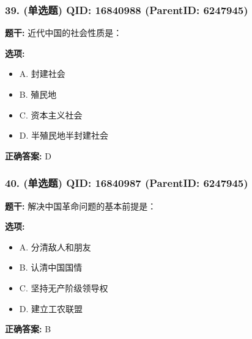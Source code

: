 \documentclass[12pt,UTF8]{ctexart}
\begin{document}
\vspace{0.3em}\hrulefill\vspace{0.7em}

\subsubsection*{39. (单选题) \small QID: 16840988 (ParentID: 6247945)}

\textbf{题干:}
近代中国的社会性质是：



\textbf{选项:}
\begin{itemize}[leftmargin=*]

  \item A. 封建社会

  \item B. 殖民地

  \item C. 资本主义社会

  \item D. 半殖民地半封建社会

\end{itemize}

\textbf{正确答案:}
D

\vspace{0.3em}\hrulefill\vspace{0.7em}

\subsubsection*{40. (单选题) \small QID: 16840987 (ParentID: 6247945)}

\textbf{题干:}
解决中国革命问题的基本前提是：



\textbf{选项:}
\begin{itemize}[leftmargin=*]

  \item A. 分清敌人和朋友

  \item B. 认清中国国情

  \item C. 坚持无产阶级领导权

  \item D. 建立工农联盟

\end{itemize}

\textbf{正确答案:}
B

\vspace{0.3em}\hrulefill\vspace{0.7em}
\end{document}
